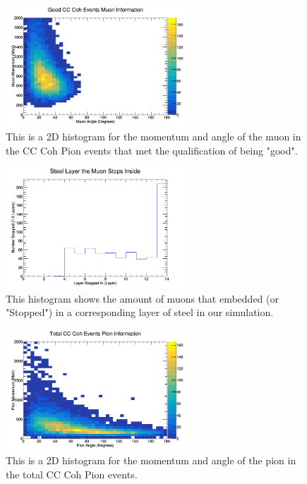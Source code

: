\documentclass[11pt]{article}
\begin{document}
\begin{figure}[H]
\centering
\includegraphics[width=0.6\textwidth]{OldNMReinSehgalImages/6-GoodCCCohMuonInfoNMORS.png}
\caption{This is a 2D histogram for the momentum and angle of the muon in the CC Coh Pion events that met the qualification of being "good".}
\end{figure}

\begin{figure}[H]
\centering
\includegraphics[width=0.6\textwidth]{OldNMReinSehgalImages/7-LayerPenetrationNMORS.png}
\caption{This histogram shows the amount of muons that embedded (or "Stopped") in a corresponding layer of steel in our simulation.}
\end{figure}

\begin{figure}[H]
\centering
\includegraphics[width=0.6\textwidth]{OldNMReinSehgalImages/8-TotalCCCohPionInfoNMORS.png}
\caption{This is a 2D histogram for the momentum and angle of the pion in the total CC Coh Pion events.}
\end{figure}
\end{document}
